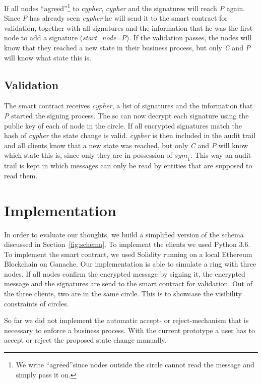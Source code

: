 \documentclass[runningheads]{llncs}
\newcommand{\ber}[1]{\textit{#1}}
\newcommand{\refsec}[1]{Section~\ref{#1}}
\newcommand{\quotel}{``}
\newcommand{\quoter}{''}
\begin{document}
If all nodes \quotel agreed\quoter \footnote{We write \quotel agreed\quoter  since nodes outside the circle cannot read the message and simply pass it on.} to \ber{cypher}, \ber{cypher} and the signatures will reach \ber{P} again. Since \ber{P} has already seen \ber{cypher} he will send it to the smart contract for validation, together with all signatures and the information that he was the first node to add a signature (\ber{start\_node=P}). If the validation passes, the nodes will know that they reached a new state in their business process, but only \ber{C} and \ber{P} will know what state this is.



\subsection{Validation} \label{subsec:furtherinfo}

The smart contract receives \ber{cypher}, a list of signatures and the information that \ber{P} started the signing process. The sc can now decrypt each signature using the public key of each of node in the circle. If all encrypted signatures match the hash of \ber{cypher} the state change is valid. \ber{cypher} is then included in the audit trail and all clients know that a new state was reached, but only \ber{C} and \ber{P} will know which state this is, since only they are in possession of ${sym}_1$. This way an audit trail is kept in which messages can only be read by entities that are supposed to read them.


\section{Implementation} \label{sec:eval}


In order to evaluate our thoughts, we build a simplified version of the schema discussed in \refsec{fig:schema}. To implement the clients we used Python 3.6. To implement the smart contract, we used Solidity running on a local Ethereum Blockchain on Ganache. Our implementation is able to simulate a ring with three nodes. If all nodes confirm the encrypted message by signing it, the encrypted message and the signatures are send to the smart contract for validation. Out of the three clients, two are in the same circle. This is to showcase the visibility constraints of circles. 

So far we did not implement the automatic accept- or reject-mechanism that is necessary to enforce a business process. With the current prototype a user has to accept or reject the proposed state change manually. 
\end{document}

